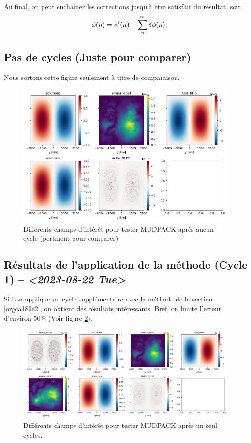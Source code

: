 \documentclass[10pt]{report}
\numberwithin{equation}{section}
\begin{document}
Au final, on peut enchaîner les corrections jusqu'à être satisfait du résultat, soit
\begin{align}
   &\hspace{4mm}\phi(n) = \phi'(n) - \sum_n^\infty \delta\phi(n); \\
\end{align}

\subsection{Pas de cycles (Juste pour comparer)}
\label{sec:org9ecc291}

Nous sortons cette figure seulement à titre de comparaison.

\begin{figure}[htbp]
\centering
\includegraphics[width=.9\linewidth]{figures/MUDPACK/2023-08-23_MUDPACK_test_dirichlet0.png}
\caption{\label{fig:org878b6cd}Différents champs d'intérêt pour tester MUDPACK après aucun cycle (pertinent pour comparer)}
\end{figure}


\subsection{Résultats de l'application de la méthode (Cycle 1) -- \textit{<2023-08-22 Tue>}}
\label{sec:org25033b3}
Si l'on applique un cycle supplémentaire avec la méthode de la section \ref{orgca180e2}, on obtient des résultats intéressants.
Bref, on limite l'erreur d'environ 50\% (Voir figure \ref{fig:org5fe9827}).

\begin{figure}[htbp]
\centering
\includegraphics[width=.9\linewidth]{figures/MUDPACK/2023-08-23_MUDPACK_test_dirichlet2.png}
\caption{\label{fig:org5fe9827}Différents champs d'intérêt pour tester MUDPACK après un seul cycles.}
\end{figure}
\end{document}
